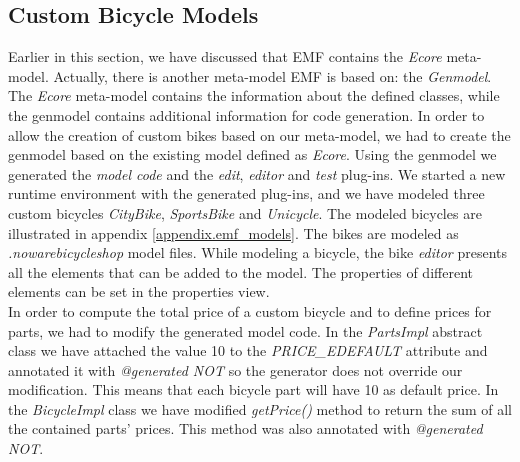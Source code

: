 \subsection{Custom Bicycle Models}
Earlier in this section, we have discussed that EMF contains the \emph{Ecore}
meta-model. Actually, there is another meta-model EMF is based on:
the \emph{Genmodel}. The \emph{Ecore} meta-model contains the information about
the defined classes, while the genmodel contains additional information for
code generation. In order to allow the creation of custom bikes based on our
meta-model, we had to create the genmodel based on the existing model defined as
\emph{Ecore}. Using the genmodel we generated the \emph{model code} and the
\emph{edit}, \emph{editor} and \emph{test} plug-ins. We started a new runtime
environment with the generated plug-ins, and we have modeled three custom bicycles
\emph{CityBike}, \emph{SportsBike} and \emph{Unicycle}. The modeled bicycles are
illustrated in appendix \ref{appendix.emf_models}. The bikes are modeled as
\emph{.nowarebicycleshop} model files. While modeling a bicycle, the bike
\emph{editor} presents all the elements that can be added to the model. The
properties of different elements can be set in the properties view.\\

In order to compute the total price of a custom bicycle and to define
prices for parts, we had to modify the generated model code. In the
\emph{PartsImpl} abstract class we have attached the value
10 to the \emph{PRICE\_EDEFAULT} attribute and annotated it with
\emph{@generated NOT} so the generator does not override our modification. This
means that each bicycle part will have 10 as default price. In the
\emph{BicycleImpl} class we have modified \emph{getPrice()} method to return the
sum of all the contained parts' prices. This method was also annotated with
\emph{@generated NOT}.

